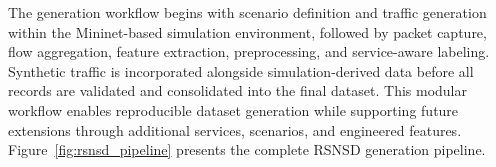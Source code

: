 \documentclass[12pt,a4paper]{report}
\begin{document}
	The generation workflow begins with scenario definition and traffic generation within the Mininet-based simulation environment, followed by packet capture, flow aggregation, feature extraction, preprocessing, and service-aware labeling. Synthetic traffic is incorporated alongside simulation-derived data before all records are validated and consolidated into the final dataset. This modular workflow enables reproducible dataset generation while supporting future extensions through additional services, scenarios, and engineered features. Figure~\ref{fig:rsnsd_pipeline} presents the complete RSNSD generation pipeline.
	

\end{document}
